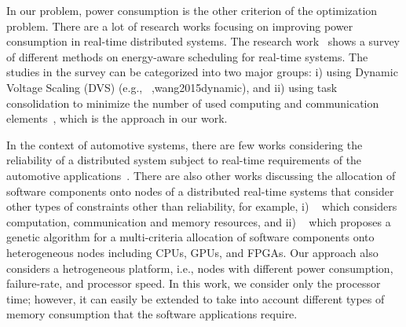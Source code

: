 
In our problem, power consumption is the other criterion of the optimization problem. There are a lot of research works focusing on improving power consumption in real-time distributed systems. The research work~\cite{bambagini2016energy} shows a survey of different methods on energy-aware scheduling for real-time systems. The studies in the survey can be categorized into two major groups: i) using Dynamic Voltage Scaling (DVS) (e.g., ~\cite{devadas2012interplay},wang2015dynamic), and ii) using task consolidation to minimize the number of used computing and communication elements~\cite{faragardi2013towards}, which is the approach in our work.

In the context of automotive systems, there are few works considering the reliability of a distributed system subject to real-time requirements of the automotive applications~\cite{islam2006dependability}\cite{kim2011autosar}. There are also other works discussing the allocation of software components onto nodes of a distributed real-time systems that consider other types of constraints other than reliability, for example, i) ~\cite{wang2004component} which considers computation, communication and memory resources, and ii) ~\cite{vsvogor2014extended} which proposes a genetic algorithm for a multi-criteria allocation of software components onto heterogeneous nodes including CPUs, GPUs, and FPGAs. Our approach also considers a hetrogeneous platform, i.e., nodes with different power consumption, failure-rate, and processor speed. In this work, we consider only the processor time; however, it can easily be extended to take into account different types of memory consumption that the software applications require.
